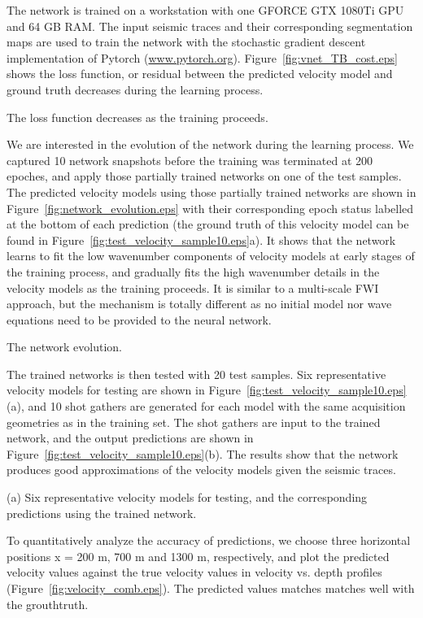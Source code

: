 \documentclass{segabs}
\begin{document}
The network is trained on a workstation with one GFORCE GTX 1080Ti GPU and 64 GB RAM. The input seismic traces and their corresponding segmentation maps are used to train the network with the stochastic gradient descent implementation of Pytorch (\url{www.pytorch.org}). Figure~\ref{fig:vnet_TB_cost.eps} shows the loss function, or residual between the predicted velocity model and ground truth decreases during the learning process. 

{The loss function decreases as the training proceeds.}

We are interested in the evolution of the network during the learning process. We captured 10 network snapshots before the training was terminated at 200 epoches, and apply those partially trained networks on one of the test samples. The predicted velocity models using those partially trained networks are shown in Figure~\ref{fig:network_evolution.eps} with their corresponding epoch status labelled at the bottom of each prediction (the ground truth of this velocity model can be found in Figure~\ref{fig:test_velocity_sample10.eps}a). It shows that the network learns to fit the low wavenumber components of velocity models at early stages of the training process, and gradually fits the high wavenumber details in the velocity models as the training proceeds. It is similar to a multi-scale FWI approach, but the mechanism is totally different as no initial model nor wave equations need to be provided to the neural network.

{The network evolution.}

The trained networks is then tested with 20 test samples. Six representative velocity models for testing are shown in Figure~\ref{fig:test_velocity_sample10.eps}(a), and 10 shot gathers are generated for each model with the same acquisition geometries as in the training set. The shot gathers are input to the trained network, and the output predictions are shown in Figure~\ref{fig:test_velocity_sample10.eps}(b). The results show that the network produces good approximations of the velocity models given the seismic traces.

{(a) Six representative velocity models for testing, and the corresponding predictions using the trained network.}

To quantitatively analyze the accuracy of predictions, we choose three horizontal positions x = 200 m, 700 m and 1300 m, respectively, and plot the predicted velocity values against the true velocity values in velocity vs. depth profiles (Figure~\ref{fig:velocity_comb.eps}). The predicted values matches matches well with the grouthtruth.
\end{document}
